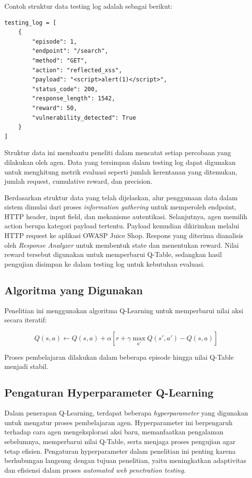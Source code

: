 Contoh struktur data testing log adalah sebagai berikut:

\begin{verbatim}
testing_log = [
    {
        "episode": 1,
        "endpoint": "/search",
        "method": "GET",
        "action": "reflected_xss",
        "payload": "<script>alert(1)</script>",
        "status_code": 200,
        "response_length": 1542,
        "reward": 50,
        "vulnerability_detected": True
    }
]
\end{verbatim}

Struktur data ini membantu peneliti dalam mencatat setiap percobaan yang dilakukan oleh agen. Data yang tersimpan dalam testing log dapat digunakan untuk menghitung metrik evaluasi seperti jumlah kerentanan yang ditemukan, jumlah request, cumulative reward, dan precision.

Berdasarkan struktur data yang telah dijelaskan, alur penggunaan data dalam sistem dimulai dari proses \textit{information gathering} untuk memperoleh endpoint, HTTP header, input field, dan mekanisme autentikasi. Selanjutnya, agen memilih action berupa kategori payload tertentu. Payload kemudian dikirimkan melalui HTTP request ke aplikasi OWASP Juice Shop. Respons yang diterima dianalisis oleh \textit{Response Analyzer} untuk membentuk state dan menentukan reward. Nilai reward tersebut digunakan untuk memperbarui Q-Table, sedangkan hasil pengujian disimpan ke dalam testing log untuk kebutuhan evaluasi.

\subsection{Algoritma yang Digunakan}
Penelitian ini menggunakan algoritma Q-Learning untuk memperbarui nilai aksi secara iteratif:

\begin{equation}
Q(s,a) \leftarrow Q(s,a) + \alpha \left[ r + \gamma \max_{a'} Q(s',a') - Q(s,a) \right]
\end{equation}

Proses pembelajaran dilakukan dalam beberapa episode hingga nilai Q-Table menjadi stabil.

\subsection{Pengaturan Hyperparameter Q-Learning}

Dalam penerapan Q-Learning, terdapat beberapa \textit{hyperparameter} yang digunakan untuk mengatur proses pembelajaran agen. Hyperparameter ini berpengaruh terhadap cara agen mengeksplorasi aksi baru, memanfaatkan pengalaman sebelumnya, memperbarui nilai Q-Table, serta menjaga proses pengujian agar tetap efisien. Pengaturan hyperparameter dalam penelitian ini penting karena berhubungan langsung dengan tujuan penelitian, yaitu meningkatkan adaptivitas dan efisiensi dalam proses \textit{automated web penetration testing}. 

